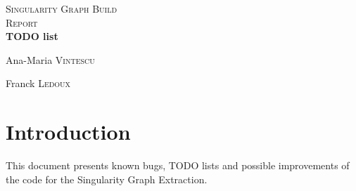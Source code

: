 \documentclass[a4paper]{report}
\begin{document}
\begin{titlepage}
\begin{center}



\textsc{\LARGE Singularity Graph Build}\\[1.5cm]

\textsc{\Large Report}\\[0.5cm]


{ \huge \bfseries TODO list \\[0.4cm] }



\begin{minipage}{0.4\textwidth}
\begin{flushleft} \large
Ana-Maria \textsc{Vintescu}
\end{flushleft}
\end{minipage}
\begin{minipage}{0.4\textwidth}
\begin{flushright} \large
Franck \textsc{Ledoux}
\end{flushright}
\end{minipage}


\date{} %

\end{center}
\end{titlepage}


\date{} %



\renewcommand{\thesection}{\arabic{section}}


\tableofcontents{}

\setcounter{tocdepth}{4}
\newpage
\section{Introduction}

{This document presents known bugs, TODO lists and possible improvements of the code for the Singularity Graph Extraction.
}



\bigskip
\end{document}
